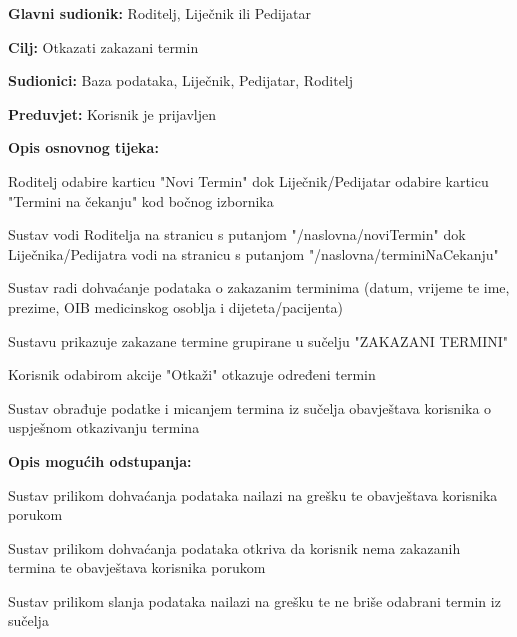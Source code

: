 					
					
					
					\noindent {}
				\begin{packed_item}
					
					\item \textbf{Glavni sudionik: }Roditelj, Liječnik ili Pedijatar
					\item  \textbf{Cilj:} Otkazati zakazani termin
					\item  \textbf{Sudionici:} Baza podataka, Liječnik, Pedijatar, Roditelj
					\item  \textbf{Preduvjet:} Korisnik je prijavljen
					\item  \textbf{Opis osnovnog tijeka:}
					
					\item[] \begin{packed_enum}
						\item Roditelj odabire karticu "Novi Termin" dok Liječnik/Pedijatar odabire karticu "Termini na čekanju" kod bočnog izbornika
						\item Sustav vodi Roditelja na stranicu s putanjom "/naslovna/noviTermin" dok Liječnika/Pedijatra vodi na stranicu s putanjom "/naslovna/terminiNaCekanju"
						\item Sustav radi dohvaćanje podataka o zakazanim terminima (datum, vrijeme te ime, prezime, OIB medicinskog osoblja i dijeteta/pacijenta)
						\item Sustavu prikazuje zakazane termine grupirane u sučelju "ZAKAZANI TERMINI"
						\item Korisnik odabirom akcije "Otkaži" otkazuje određeni termin
						\item Sustav obrađuje podatke i micanjem termina iz sučelja obavještava korisnika o uspješnom otkazivanju termina
					\end{packed_enum}
					
					\item  \textbf{Opis mogućih odstupanja:}
					
					\item[] \begin{packed_item}
						\item[3.a] Sustav prilikom dohvaćanja podataka nailazi na grešku te obavještava korisnika porukom
						
						\item[3.b] Sustav prilikom dohvaćanja podataka otkriva da korisnik nema zakazanih termina te obavještava korisnika porukom
						
						\item[6.a] Sustav prilikom slanja podataka nailazi na grešku te ne briše odabrani termin iz sučelja
					\end{packed_item}
				\end{packed_item}				
							
